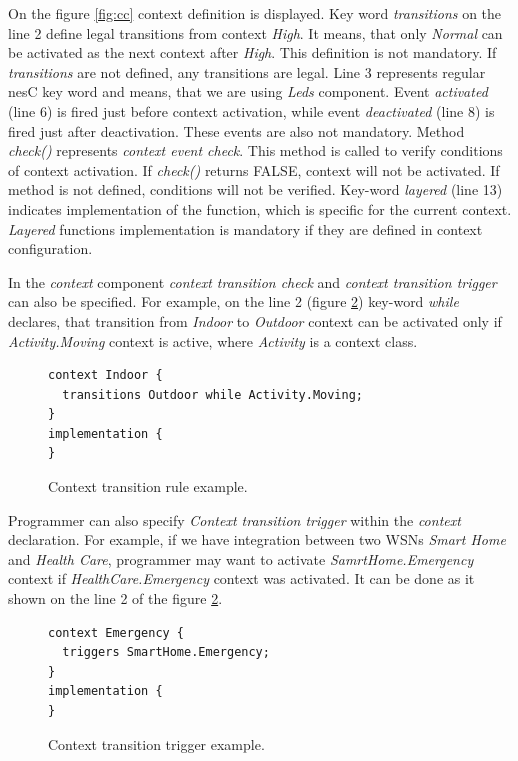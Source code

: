 \documentclass[12pt,a4paper]{article}
\begin{document}
On the figure \ref{fig:cc} context definition is displayed. Key word \textit{transitions} on the line 2 define legal transitions from context \textit{High}. It means, that only \textit{Normal} can be activated as the next context after \textit{High}. This definition is not mandatory. If \textit{transitions} are not defined, any transitions are legal. Line 3 represents regular nesC key word and means, that we are using \textit{Leds} component. Event \textit{activated} (line 6) is fired just before context activation, while event \textit{deactivated} (line 8) is fired just after deactivation. These events are also not mandatory. Method \textit{check()} represents \textit{context event check}. This method is called to verify conditions of context activation. If \textit{check()} returns FALSE, context will not be activated. If method is not defined, conditions will not be verified. Key-word \textit{layered} (line 13) indicates implementation of the function, which is specific for the current context. \textit{Layered} functions implementation is mandatory if they are defined in context configuration.

In the \textit{context} component \textit{context transition check} and \textit{context transition trigger} can also be specified. For example, on the line 2 (figure \ref{fig:ctre}) key-word \textit{while} declares, that transition from \textit{Indoor} to \textit{Outdoor} context can be activated only if \textit{Activity.Moving} context is active, where \textit{Activity} is a context class.

\begin{figure}[H]
\begin{lstlisting}
context Indoor {
  transitions Outdoor while Activity.Moving;
}
implementation {
}
\end{lstlisting}
\caption{Context transition rule example.}
\label{fig:ctre}
\end{figure}

Programmer can also specify \textit{Context transition trigger} within the \textit{context} declaration. For example, if we have integration between two WSNs \textit{Smart Home} and \textit{Health Care}, programmer may want to activate \textit{SamrtHome.Emergency} context if \textit{HealthCare.Emergency} context was activated. It can be done as it shown on the line 2 of the figure \ref{fig:ctre}.

\begin{figure}[H]
\begin{lstlisting}
context Emergency {
  triggers SmartHome.Emergency;
}
implementation {
}
\end{lstlisting}
\caption{Context transition trigger example.}
\label{fig:ctre}
\end{figure}
\end{document}
